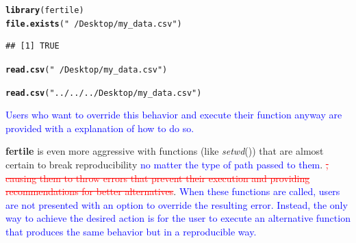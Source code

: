 \documentclass[APA,LATO1COL]{WileyNJD-v2}\usepackage[]{graphicx}\usepackage[]{color}
\makeatletter
\newcommand{\hlstr}[1]{\textcolor[rgb]{0.192,0.494,0.8}{#1}}%
\newcommand{\hlstd}[1]{\textcolor[rgb]{0.345,0.345,0.345}{#1}}%
\newcommand{\hlkwd}[1]{\textcolor[rgb]{0.737,0.353,0.396}{\textbf{#1}}}%
\newenvironment{kframe}{%
 \def\at@end@of@kframe{}%
 \ifinner\ifhmode%
  \def\at@end@of@kframe{\end{minipage}}%
  \begin{minipage}{\columnwidth}%
 \fi\fi%
 \def\FrameCommand##1{\hskip\@totalleftmargin \hskip-\fboxsep
 \colorbox{shadecolor}{##1}\hskip-\fboxsep
     \hskip-\linewidth \hskip-\@totalleftmargin \hskip\columnwidth}%
 \MakeFramed {\advance\hsize-\width
   \@totalleftmargin\z@ \linewidth\hsize
   \@setminipage}}%
 {\par\unskip\endMakeFramed%
 \at@end@of@kframe}
\newenvironment{knitrout}{}{} %
\newcommand{\pkg}[1]{\textbf{#1}}
\newcommand{\func}[1]{\textit{#1}()}
\makeatother
\begin{document}
\begin{knitrout}
\color{fgcolor}\begin{kframe}
\begin{alltt}
\hlkwd{library}\hlstd{(fertile)}
\hlkwd{file.exists}\hlstd{(}\hlstr{"~/Desktop/my_data.csv"}\hlstd{)}
\end{alltt}
\begin{verbatim}
## [1] TRUE
\end{verbatim}
\begin{alltt}
\hlkwd{read.csv}\hlstd{(}\hlstr{"~/Desktop/my_data.csv"}\hlstd{)}
\end{alltt}


{\ttfamily\noindent\bfseries\color{errorcolor}{\#\# Error: Detected absolute paths. Absolute paths are not reproducible and will likely only work on your computer. If you would like to continue anyway, re-execute your command by typing the name of the package it originates from followed by :: and the function call, e.g. if you previously typed 'read\_csv(path)', instead use 'readr::read\_csv(path)'}}\begin{alltt}
\hlkwd{read.csv}\hlstd{(}\hlstr{"../../../Desktop/my_data.csv"}\hlstd{)}
\end{alltt}


{\ttfamily\noindent\bfseries\color{errorcolor}{\#\# Error: Detected paths that lead outside the project directory. Such paths are not reproducible and will likely only work on your computer. If you would like to continue anyway, re-execute your command by typing the name of the package it originates from followed by :: and the function call, e.g. if you previously typed 'read\_csv(path)', instead use 'readr::read\_csv(path)'}}\end{kframe}
\end{knitrout}

\textcolor{blue}{Users who want to override this behavior and execute their function anyway are provided with a explanation of how to do so.}


\pkg{fertile} is even more aggressive with functions (like \func{setwd}) that are almost certain to break reproducibility \textcolor{blue}{no matter the type of path passed to them}. \textcolor{red}{\st{, causing them to throw errors that prevent their execution and providing recommendations for better alternatives}}. \textcolor{blue}{When these functions are called, users are not presented with an option to override the resulting error. Instead, the only way to achieve the desired action is for the user to execute an alternative function that produces the same behavior but in a reproducible way.}
\end{document}
